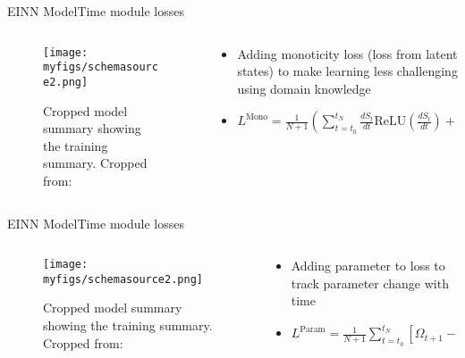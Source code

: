 \documentclass[
	aspectratio=169,	%
	onlytextwidth,		%
	t,					%
	]{beamer}
\begin{document}
\begin{frame}[fragile]{EINN Model}{Time module losses}
	\begin{columns}
		
		\begin{column}[T]{.5\textwidth}
			\begin{figure}
				\texttt{[image: myfigs/schemasource2.png]}
				\caption{Cropped model summary showing the training summary. Cropped from:~\cite{main}}
			\end{figure}
		\end{column}
		
		\begin{column}[T]{.5\textwidth}
			\begin{itemize}
				\item<1-> Adding monoticity loss (loss from latent states) to make learning less challenging using domain knowledge 
				\item<2->	$L^{\text{Mono}} = \frac{1}{N+1} (\sum_{t=t_{0}}^{t_{N}} \frac{dS_{t}}{dt}\text{ReLU} (\frac{dS_{t}}{dt}) + \sum_{t=t_{0}}^{t_{N}} -1\frac{dR_{t}}{dt}\text{ReLU} (-\frac{dR_{t}}{dt}))$
			\end{itemize}
		\end{column}
			
\end{columns}
\end{frame}

\begin{frame}[fragile]{EINN Model}{Time module losses}
	\begin{columns}
		
		\begin{column}[T]{.5\textwidth}
			\begin{figure}
				\texttt{[image: myfigs/schemasource2.png]}
				\caption{Cropped model summary showing the training summary. Cropped from:~\cite{main}}
			\end{figure}
		\end{column}
		
		\begin{column}[T]{.5\textwidth}
			\begin{itemize}
				\item<1-> Adding parameter to loss to track parameter change with time
				\item<2-> $L^{\text{Param}} = \frac{1}{N+1} \sum_{t=t_{0}}^{t_{N}} \left[ \Omega_{t+1} - \Omega_{t} \right]^{2} $
			\end{itemize}
		\end{column}
			
\end{columns}
\end{frame}
\end{document}
